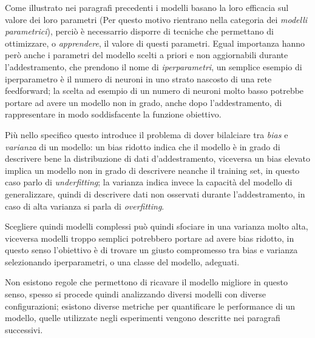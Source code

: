 \documentclass[../../main.tex]{subfiles}
\begin{document}
Come illustrato nei paragrafi precedenti i modelli basano la loro efficacia sul valore dei loro parametri (Per questo motivo rientrano nella categoria dei \textit{modelli parametrici}), perciò è necessarrio disporre di tecniche che permettano di ottimizzare, o \textit{apprendere}, il valore di questi parametri. Egual importanza hanno però anche i parametri del modello scelti a priori e non aggiornabili durante l'addestramento, che prendono il nome di \textit{iperparametri}, un semplice esempio di iperparametro è il numero di neuroni in uno strato nascosto di una rete feedforward; la scelta ad esempio di un numero di neuroni molto basso potrebbe portare ad avere un modello non in grado, anche dopo l'addestramento, di rappresentare in modo soddisfacente la funzione obiettivo.

Più nello specifico questo introduce il problema di dover bilalciare tra \textit{bias} e \textit{varianza} di un modello: un bias ridotto indica che il modello è in grado di descrivere bene la distribuzione di dati d'addestramento, viceversa un bias elevato implica un modello non in grado di descrivere neanche il training set, in questo caso parlo di \textit{underfitting}; la varianza indica invece la capacità del modello di generalizzare, quindi di descrivere dati non osservati durante l'addestramento, in caso di alta varianza si parla di \textit{overfitting}.

Scegliere quindi modelli complessi può quindi sfociare in una varianza molto alta, viceversa modelli troppo semplici potrebbero portare ad avere bias ridotto, in questo senso l'obiettivo è di trovare un giusto compromesso tra bias e varianza selezionando iperparametri, o una classe del modello, adeguati.

Non esistono regole che permettono di ricavare il modello migliore in questo senso, spesso si procede quindi analizzando diversi modelli con diverse configurazioni; esistono diverse metriche per quantificare le performance di un modello, quelle utilizzate negli esperimenti vengono descritte nei paragrafi successivi.
\end{document}
